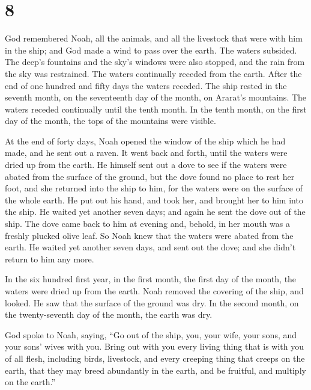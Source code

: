 \hypertarget{section-7}{%
\section{8}\label{section-7}}

 God remembered Noah, all the animals, and all the livestock
that were with him in the ship; and God made a wind to pass over the
earth. The waters subsided.  The deep's fountains and the
sky's windows were also stopped, and the rain from the sky was
restrained.  The waters continually receded from the earth.
After the end of one hundred and fifty days the waters receded.
 The ship rested in the seventh month, on the seventeenth
day of the month, on Ararat's mountains.  The waters receded
continually until the tenth month. In the tenth month, on the first day
of the month, the tops of the mountains were visible.

 At the end of forty days, Noah opened the window of the
ship which he had made,  and he sent out a raven. It went
back and forth, until the waters were dried up from the earth.
 He himself sent out a dove to see if the waters were abated
from the surface of the ground,  but the dove found no place
to rest her foot, and she returned into the ship to him, for the waters
were on the surface of the whole earth. He put out his hand, and took
her, and brought her to him into the ship.  He waited yet
another seven days; and again he sent the dove out of the ship.
 The dove came back to him at evening and, behold, in her
mouth was a freshly plucked olive leaf. So Noah knew that the waters
were abated from the earth.  He waited yet another seven
days, and sent out the dove; and she didn't return to him any more.

 In the six hundred first year, in the first month, the
first day of the month, the waters were dried up from the earth. Noah
removed the covering of the ship, and looked. He saw that the surface of
the ground was dry.  In the second month, on the
twenty-seventh day of the month, the earth was dry.

 God spoke to Noah, saying,  ``Go out of the
ship, you, your wife, your sons, and your sons' wives with you.
 Bring out with you every living thing that is with you of
all flesh, including birds, livestock, and every creeping thing that
creeps on the earth, that they may breed abundantly in the earth, and be
fruitful, and multiply on the earth.''

